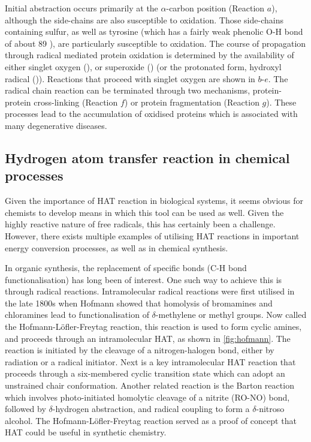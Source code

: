 Initial abstraction occurs primarily at the $\alpha$-carbon position (Reaction
$a$), although the side-chains are also susceptible to oxidation.  Those
side-chains containing sulfur,\cite{Stadtman2004} as well as tyrosine (which has
a fairly weak phenolic O-H bond of about 89 \kcalmol),\cite{Mulder2005} are
particularly susceptible to oxidation. The course of propagation through radical
mediated protein oxidation is determined by the availability of either singlet
oxygen (), or superoxide () (or the protonated form,
hydroxyl radical ()). Reactions that proceed with singlet oxygen are
shown in $b$-$e$. The radical chain reaction can be terminated through two
mechanisms, protein-protein cross-linking (Reaction $f$) or protein
fragmentation (Reaction $g$). These processes lead to the accumulation of
oxidised proteins which is associated with many degenerative
diseases.\cite{Halliwell2006}


\subsection{Hydrogen atom transfer reaction in chemical processes}

Given the importance of HAT reaction in biological systems, it seems obvious for
chemists to develop means in which this tool can be used as well. Given the
highly reactive nature of free radicals, this has certainly been a challenge.
However, there exists multiple examples of utilising HAT reactions in important
energy conversion processes,\cite{Hammes-Schiffer2012} as well as in chemical
synthesis.\cite{Balcells2016,Miller2016}

In organic synthesis, the replacement of specific  bonds (C-H bond
functionalisation) has long been of interest. One such way to achieve this is
through radical reactions.\cite{Godula2006} Intramolecular radical reactions
were first utilised in the late 1800s when Hofmann showed that homolysis of
bromamines and chloramines lead to functionalisation of $\delta$-methylene or
methyl groups. Now called the
Hofmann-L{\"o}fler-Freytag reaction, this reaction is used to form cyclic
amines, and proceeds through an intramolecular HAT, as shown in
\ref{fig:hofmann}. The reaction is initiated by the cleavage of a
nitrogen-halogen bond, either by radiation or a radical initiator. Next is a key
intramolecular HAT reaction that proceeds through a six-membered cyclic
transition state which can adopt an unstrained chair conformation.  Another
related reaction is the Barton reaction\cite{Barton1960} which involves
photo-initiated homolytic cleavage of a nitrite (RO-NO) bond, followed by
$\delta$-hydrogen abstraction, and radical coupling to form a $\delta$-nitroso
alcohol. The Hofmann-L{\"o}fler-Freytag reaction served as a proof of concept
that HAT could be useful in synthetic chemistry.


